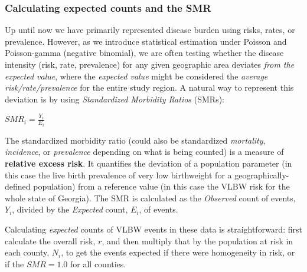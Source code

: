 \documentclass[
]{book}
\newenvironment{Shaded}{\begin{snugshade}}{\end{snugshade}}
\newcommand{\AttributeTok}[1]{\textcolor[rgb]{0.77,0.63,0.00}{#1}}
\newcommand{\CommentTok}[1]{\textcolor[rgb]{0.56,0.35,0.01}{\textit{#1}}}
\newcommand{\FunctionTok}[1]{\textcolor[rgb]{0.00,0.00,0.00}{#1}}
\newcommand{\NormalTok}[1]{#1}
\newcommand{\OtherTok}[1]{\textcolor[rgb]{0.56,0.35,0.01}{#1}}
\newcommand{\SpecialCharTok}[1]{\textcolor[rgb]{0.00,0.00,0.00}{#1}}
\begin{document}
\hypertarget{calculating-expected-counts-and-the-smr}{%
\subsubsection{Calculating expected counts and the SMR}\label{calculating-expected-counts-and-the-smr}}

Up until now we have primarily represented disease burden using risks, rates, or prevalence. However, as we introduce statistical estimation under Poisson and Poisson-gamma (negative binomial), we are often testing whether the disease intensity (risk, rate, prevalence) for any given geographic area deviates \emph{from the expected value}, where the \emph{expected value} might be considered the \emph{average risk/rate/prevalence} for the entire study region. A natural way to represent this deviation is by using \emph{Standardized Morbidity Ratios} (SMRs):

\(SMR_i=\frac{Y_i}{E_i}\)

The standardized morbidity ratio (could also be standardized \emph{mortality}, \emph{incidence}, or \emph{prevalence} depending on what is being counted) is a measure of \textbf{relative excess risk}. It quantifies the deviation of a population parameter (in this case the live birth prevalence of very low birthweight for a geographically-defined population) from a reference value (in this case the VLBW risk for the whole state of Georgia). The SMR is calculated as the \emph{Observed} count of events, \(Y_i\), divided by the \emph{Expected} count, \(E_i\), of events.

Calculating \emph{expected} counts of VLBW events in these data is straightforward: first calculate the overall risk, \(r\), and then multiply that by the population at risk in each county, \(N_i\), to get the events expected if there were homogeneity in risk, or if the \(SMR=1.0\) for all counties.

\begin{Shaded}
\end{Shaded}
\end{document}
